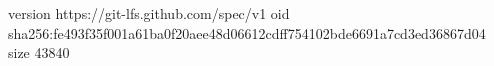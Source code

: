 version https://git-lfs.github.com/spec/v1
oid sha256:fe493f35f001a61ba0f20aee48d06612cdff754102bde6691a7cd3ed36867d04
size 43840

